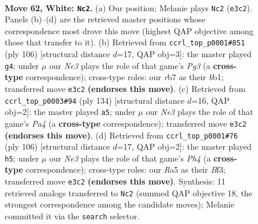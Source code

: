 \documentclass[11pt]{article}
\begin{document}
\clearpage

\begin{figure}[p]\centering
\begin{subfigure}{0.46\textwidth}\centering
\resizebox{\linewidth}{!}{%
\newchessgame
\chessboard[
  setfen={7k/1r4b1/3R4/R7/2P4K/4N3/8/8 w - - 44 62},
  showmover=false,
  pgfstyle=straightmove, color=movearrow, markmove={e3-c2}
]}
\caption{}
\end{subfigure}\hfill
\begin{subfigure}{0.46\textwidth}\centering
\resizebox{\linewidth}{!}{%
\newchessgame
\chessboard[
  setfen={8/8/2R5/8/1b6/k5P1/7K/1b6 w - - 0 54},
  showmover=false,
  pgfstyle=straightmove, color=movearrow, markmove={g3-g4}
]}
\caption{}
\end{subfigure}
\\[4pt]
\begin{subfigure}{0.46\textwidth}\centering
\resizebox{\linewidth}{!}{%
\newchessgame
\chessboard[
  setfen={8/8/8/2R5/P3b3/3k4/7r/5K2 w - - 1 68},
  showmover=false,
  pgfstyle=straightmove, color=movearrow, markmove={a4-a5}
]}
\caption{}
\end{subfigure}\hfill
\begin{subfigure}{0.46\textwidth}\centering
\resizebox{\linewidth}{!}{%
\newchessgame
\chessboard[
  setfen={8/6k1/2R5/8/r2b3P/5B2/3K4/8 w - - 0 54},
  showmover=false,
  pgfstyle=straightmove, color=movearrow, markmove={h4-h5}
]}
\caption{}
\end{subfigure}
\caption{\textbf{Move 62, White: \texttt{Nc2}.} (a) Our position; Melanie plays \texttt{Nc2} (\texttt{e3c2}). Panels (b)--(d) are the retrieved master positions whose correspondence most drove this move (highest QAP objective among those that transfer to it). (b) Retrieved from \texttt{ccrl\_top\_p0001\#851} (ply 106) [structural distance $d$=17, QAP obj=3]: the master played \texttt{g4}; under $\mu$ our \emph{Ne3} plays the role of that game's \emph{Pg3} (a \textbf{cross-type} correspondence); cross-type roles: our \emph{r}b7 as their \emph{b}b1; transferred move \texttt{e3c2} \textbf{(endorses this move)}. (c) Retrieved from \texttt{ccrl\_top\_p0003\#94} (ply 134) [structural distance $d$=16, QAP obj=2]: the master played \texttt{a5}; under $\mu$ our \emph{Ne3} plays the role of that game's \emph{Pa4} (a \textbf{cross-type} correspondence); transferred move \texttt{e3c2} \textbf{(endorses this move)}. (d) Retrieved from \texttt{ccrl\_top\_p0001\#76} (ply 106) [structural distance $d$=17, QAP obj=2]: the master played \texttt{h5}; under $\mu$ our \emph{Ne3} plays the role of that game's \emph{Ph4} (a \textbf{cross-type} correspondence); cross-type roles: our \emph{R}a5 as their \emph{B}f3; transferred move \texttt{e3c2} \textbf{(endorses this move)}. Synthesis: 11 retrieved analogs transferred to \texttt{Nc2} (summed QAP objective 18, the strongest correspondence among the candidate moves); Melanie committed it via the \texttt{search} selector.}
\label{fig:thought-m122}
\end{figure}
\end{document}
